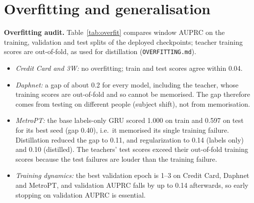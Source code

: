 \documentclass[twoside,english]{article}
\begin{document}
\section{Overfitting and generalisation} \label{sec:gen}
\textbf{Overfitting audit.} Table~\ref{tab:overfit} compares window AUPRC on the training, validation and test splits of the deployed checkpoints; teacher training scores are out-of-fold, as used for distillation (\texttt{OVERFITTING.md}).
\begin{itemize}[leftmargin=*,nosep]
\item \emph{Credit Card and 3W:} no overfitting; train and test scores agree within 0.04.
\item \emph{Daphnet:} a gap of about 0.2 for every model, including the teacher, whose training scores are out-of-fold and so cannot be memorised. The gap therefore comes from testing on different people (subject shift), not from memorisation.
\item \emph{MetroPT:} the base labels-only GRU scored 1.000 on train and 0.597 on test for its best seed (gap 0.40), i.e.\ it memorised its single training failure. Distillation reduced the gap to 0.11, and regularization to 0.14 (labels only) and 0.10 (distilled). The teachers' test scores exceed their out-of-fold training scores because the test failures are louder than the training failure.
\item \emph{Training dynamics:} the best validation epoch is 1--3 on Credit Card, Daphnet and MetroPT, and validation AUPRC falls by up to 0.14 afterwards, so early stopping on validation AUPRC is essential.
\end{itemize}
\end{document}
